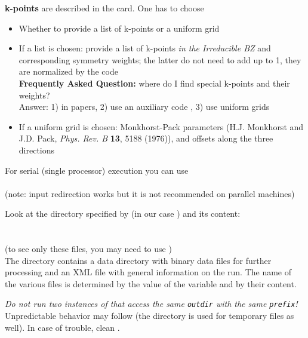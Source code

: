 \documentclass[landscape]{foils}
\begin{document}

{\bf k-points} are described in the  card. One has to choose

\begin{itemize}
\item  Whether to provide a list of k-points or a uniform grid\\

\item  If a list is chosen: provide a list of k-points {\em in the Irreducible
BZ} and corresponding symmetry weights; the latter do not need to add 
up to 1, they are normalized by the code\\[1em]
{\bf Frequently Asked Question:} where do I find special k-points 
and their weights?\\
{\gray Answer: 1) in papers, 2) use an auxiliary code , 
  3) use uniform grids}

\item  If a uniform grid is chosen: Monkhorst-Pack parameters
(H.J. Monkhorst and J.D. Pack, {\sl Phys. Rev. B} {\bf 13}, 5188 (1976)),
and offsets along the three directions
\end{itemize}

For serial (single processor) execution you can use\\[0.5em]
\\[0.5em]
{\small (note: input redirection  works but it
  is not recommended on parallel machines)}

Look at the directory specified by  (in our case
) and its content:\\[0.5em] 
\\
\\[0.3em]
{\small\gray (to see only these files, you may need to use
)}\\

The directory contains a data directory with binary data files for
further processing and an XML file with general information on the run.
The name of the various files is determined by the value of the 
 variable and by their content.

{\red\em Do not run two instances of  that access the same
  \texttt{outdir} with the same \texttt{prefix}!} Unpredictable
behavior may follow (the directory is used for temporary files as
well).  In case of trouble, clean .
\end{document}
